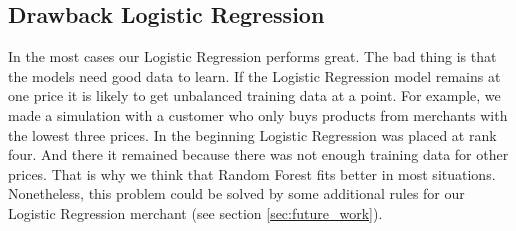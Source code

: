 \subsection{Drawback Logistic Regression}
    In the most cases our Logistic Regression performs great. The bad thing is that the models need good data to learn. If the Logistic Regression model remains at one price it is likely to get unbalanced training data at a point. For example, we made a simulation with a customer who only buys products from merchants with the lowest three prices. In the beginning Logistic Regression was placed at rank four. And there it remained because there was not enough training data for other prices. That is why we think that Random Forest fits better in most situations. Nonetheless, this problem could be solved by some additional rules for our Logistic Regression merchant (see section \ref{sec:future_work}).
